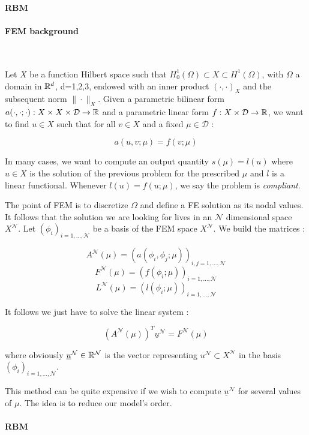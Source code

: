 \documentclass[a4paper]{article}
\begin{document}
\begin{center}\Large\bf RBM\end{center}

\paragraph{FEM background}~


Let $X$ be a function Hilbert space such that $H_0^1(\Omega)\subset X\subset H^1(\Omega)$, with $\Omega$ a domain in $\mathbb{R}^d$, d=1,2,3, endowed with an inner product $(\cdot,\cdot)_X$ and the subsequent norm $\|\cdot\|_X$. Given a parametric bilinear form $a(\cdot,\cdot;\cdot):X\times X\times\mathcal D\to\mathbb{R}$ and a parametric linear form $f:X\times\mathcal D\to\mathbb{R}$, we want to find $u\in X$ such that for all $v\in X$ and a fixed $\mu\in\mathcal D$ :

$$a(u,v;\mu)=f(v;\mu)$$

\noindent In many cases, we want to compute an output quantity $s(\mu)=l(u)$ where $u\in X$ is the solution of the previous problem for the prescribed $\mu$ and $l$ is a linear functional. Whenever $l(u)=f(u;\mu)$, we say the problem is \emph{compliant}.


The point of FEM is to discretize $\Omega$ and define a FE solution as its nodal values. It follows that the solution we are looking for lives in an $\mathcal N$ dimensional space $X^\mathcal N$. Let $\left(\phi_i\right)_{i=1,...,\mathcal N}$ be a basis of the FEM space $X^\mathcal N$. We build the matrices :

$$A^\mathcal N(\mu)=(a(\phi_i,\phi_j;\mu))_{i,j=1,...,\mathcal N}$$
$$F^\mathcal N(\mu)=(f(\phi_i;\mu))_{i=1,...,\mathcal N}$$
$$L^\mathcal N(\mu)=(l(\phi_i;\mu))_{i=1,...,\mathcal N}$$

\noindent It follows we just have to solve the linear system :

$$\left(A^\mathcal N(\mu)\right)^T\underline{u}^\mathcal N=F^\mathcal N(\mu)$$

\noindent where obviously $\underline u^\mathcal N\in\mathbb{R}^\mathcal N$ is the vector representing $u^\mathcal N\subset X^\mathcal N$ in the basis $\left(\phi_i\right)_{i=1,...,\mathcal N}$.


This method can be quite expensive if we wish to compute $\underline u^\mathcal N$ for several values of $\mu$. The idea is to reduce our model's order.

\paragraph{RBM}~
\end{document}
